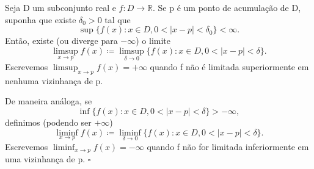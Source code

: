 \documentclass[Analysis/analysis_notes.tex]{subfiles}
\begin{document}
\begin{def*}
	Seja D um subconjunto real e $f:D\rightarrow \mathbb{R}$. Se p \'e um ponto de acumula\c c\~ao de D, suponha que existe $\delta_{0} > 0$
	tal que
	$$
		\sup{\{f(x):x\in D, 0<|x-p|<\delta_{0}\}} < \infty.
	$$
	Ent\~ao, existe (ou diverge para $-\infty$) o limite
	$$
		\limsup_{x\to p}f(x)\coloneqq \limsup_{\delta\to0}\{f(x):x\in D, 0<|x-p|<\delta\}.
	$$
	Escrevemos $\limsup_{x\to p}f(x) = +\infty$ quando f n\~ao \'e limitada superiormente em nenhuma vizinhan\c ca de p.

	De maneira an\'aloga, se
	$$
		\inf{\{f(x):x\in D, 0<|x-p|<\delta\}} > -\infty,
	$$
	definimos (podendo ser $+\infty$)
	$$
		\liminf_{x\to p}f(x)\coloneqq \liminf_{\delta\to0}\{f(x):x\in D, 0<|x-p|<\delta\}.
	$$
	Escrevemos $\liminf_{x\to p}f(x) = -\infty$ quando f n\~ao for limitada inferiormente em uma vizinhan\c ca de p. $\square$
\end{def*}
\end{document}
